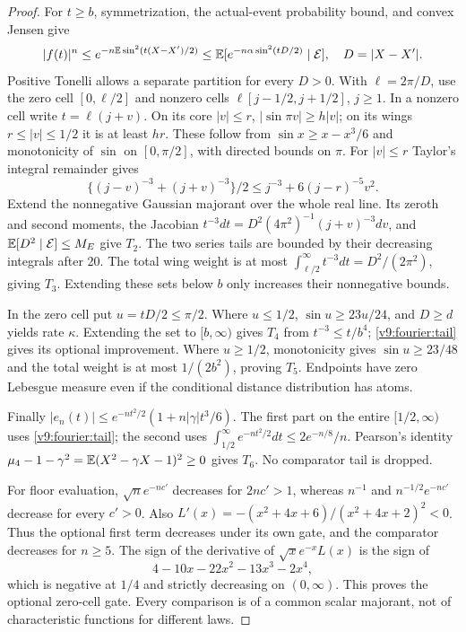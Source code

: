 \begin{proof}
For $t\ge b$, symmetrization, the actual-event probability bound,
and convex Jensen give
\[
 |f(t)|^n\le e^{-n\mathbb E\sin^2(t(X-X')/2)}
 \le\mathbb E[e^{-n\alpha\sin^2(tD/2)}\mid\mathcal E],
 \quad D=|X-X'|.
\]
Positive Tonelli allows a separate partition for every $D>0$.
With $\ell=2\pi/D$, use the zero cell $[0,\ell/2]$ and nonzero
cells $\ell[j-1/2,j+1/2]$, $j\ge1$. In a nonzero cell write
$t=\ell(j+v)$. On its core $|v|\le r$,
$|\sin\pi v|\ge h|v|$; on its wings $r\le|v|\le1/2$ it is
at least $hr$. These follow from $\sin x\ge x-x^3/6$ and
monotonicity of $\sin$ on $[0,\pi/2]$, with directed bounds on $\pi$.
For $|v|\le r$ Taylor's integral remainder gives
\[
 \{(j-v)^{-3}+(j+v)^{-3}\}/2
 \le j^{-3}+6(j-r)^{-5}v^2.
\]
Extend the nonnegative Gaussian majorant over the whole real line.
Its zeroth and second moments, the Jacobian
$t^{-3}dt=D^2(4\pi^2)^{-1}(j+v)^{-3}dv$, and
$\mathbb E[D^2\mid\mathcal E]\le M_E$ give $T_2$.
The two series tails are bounded by their decreasing integrals after
20. The total wing weight is at most
$\int_{\ell/2}^\infty t^{-3}dt=D^2/(2\pi^2)$, giving $T_3$.
Extending these sets below $b$ only increases their nonnegative bounds.

In the zero cell put $u=tD/2\le\pi/2$. Where $u\le1/2$,
$\sin u\ge23u/24$, and $D\ge d$ yields rate $\kappa$.
Extending the set to $[b,\infty)$ gives $T_4$ from
$t^{-3}\le t/b^4$; \eqref{v9:fourier:tail} gives its optional improvement.
Where $u\ge1/2$, monotonicity gives $\sin u\ge23/48$ and the total
weight is at most $1/(2b^2)$, proving $T_5$. Endpoints have zero
Lebesgue measure even if the conditional distance distribution has atoms.

Finally $|e_n(t)|\le e^{-nt^2/2}(1+n|\gamma|t^3/6)$.
The first part on the entire $[1/2,\infty)$ uses
\eqref{v9:fourier:tail}; the second uses
$\int_{1/2}^\infty e^{-nt^2/2}dt\le2e^{-n/8}/n$.
Pearson's identity $\mu_4-1-\gamma^2=\mathbb E(X^2-\gamma X-1)^2\ge0$
gives $T_6$. No comparator tail is dropped.

For floor evaluation, $\sqrt n e^{-nc'}$ decreases for $2nc'>1$,
whereas $n^{-1}$ and $n^{-1/2}e^{-nc'}$ decrease for every $c'>0$.
Also $L'(x)=-(x^2+4x+6)/(x^2+4x+2)^2<0$.
Thus the optional first term decreases under its own gate, and the
comparator decreases for $n\ge5$. The sign of the derivative of
$\sqrt{x}e^{-x}L(x)$ is the sign of
\[
 4-10x-22x^2-13x^3-2x^4,
\]
which is negative at $1/4$ and strictly decreasing on $(0,\infty)$.
This proves the optional zero-cell gate. Every comparison is of a common
scalar majorant, not of characteristic functions for different laws.
\end{proof}


